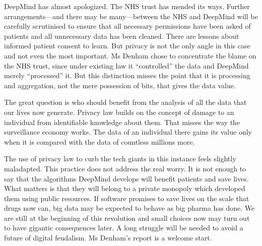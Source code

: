DeepMind has almost apologized. The NHS trust has mended its ways.
Further arrangements---and there may be many---between the NHS and
DeepMind will be carefully scrutinised to ensure that all necessary
permissions have been asked of patients and all unnecessary data has
been cleaned. There are lessons about informed patient consent to
learn. But privacy is not the only angle in this case and not even the
most important. Ms Denham chose to concentrate the blame on the NHS
trust, since under existing law it ``controlled'' the data and DeepMind
merely ``processed'' it. But this distinction misses the point that it
is processing and aggregation, not the mere possession of bits, that
gives the data value.

The great question is who should benefit from the analysis of all the
data that our lives now generate. Privacy law builds on the concept of
damage to an individual from identifiable knowledge about them. That
misses the way the surveillance economy works. The data of an
individual there gains its value only when it is compared with the data
of countless millions more.

The use of privacy law to curb the tech giants in this instance feels
slightly maladapted. This practice does not address the real worry. It
is not enough to say that the algorithms DeepMind develops will benefit
patients and save lives. What matters is that they will belong to a
private monopoly which developed them using public resources. If
software promises to save lives on the scale that drugs now can, big
data may be expected to behave as big pharma has done. We are still at
the beginning of this revolution and small choices now may turn out to
have gigantic consequences later. A long struggle will be needed to
avoid a future of digital feudalism. Ms Denham's report is a welcome
start.

